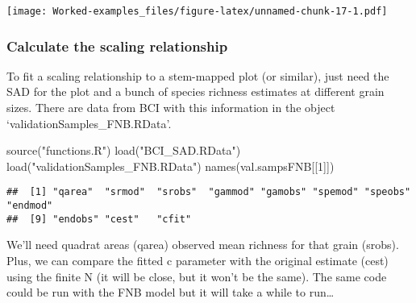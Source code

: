 \documentclass[
]{article}
\newenvironment{Shaded}{\begin{snugshade}}{\end{snugshade}}
\newcommand{\AttributeTok}[1]{\textcolor[rgb]{0.77,0.63,0.00}{#1}}
\newcommand{\CommentTok}[1]{\textcolor[rgb]{0.56,0.35,0.01}{\textit{#1}}}
\newcommand{\ControlFlowTok}[1]{\textcolor[rgb]{0.13,0.29,0.53}{\textbf{#1}}}
\newcommand{\DecValTok}[1]{\textcolor[rgb]{0.00,0.00,0.81}{#1}}
\newcommand{\FloatTok}[1]{\textcolor[rgb]{0.00,0.00,0.81}{#1}}
\newcommand{\FunctionTok}[1]{\textcolor[rgb]{0.00,0.00,0.00}{#1}}
\newcommand{\NormalTok}[1]{#1}
\newcommand{\OtherTok}[1]{\textcolor[rgb]{0.56,0.35,0.01}{#1}}
\newcommand{\SpecialCharTok}[1]{\textcolor[rgb]{0.00,0.00,0.00}{#1}}
\newcommand{\StringTok}[1]{\textcolor[rgb]{0.31,0.60,0.02}{#1}}
\begin{document}
\texttt{[image: Worked-examples\_files/figure-latex/unnamed-chunk-17-1.pdf]}

\hypertarget{calculate-the-scaling-relationship}{%
\subsubsection{Calculate the scaling
relationship}\label{calculate-the-scaling-relationship}}

To fit a scaling relationship to a stem-mapped plot (or similar), just
need the SAD for the plot and a bunch of species richness estimates at
different grain sizes. There are data from BCI with this information in
the object `validationSamples\_FNB.RData'.

\begin{Shaded}
\begin{Highlighting}[]
\FunctionTok{source}\NormalTok{(}\StringTok{"functions.R"}\NormalTok{)}
\FunctionTok{load}\NormalTok{(}\StringTok{"BCI\_SAD.RData"}\NormalTok{)}
\FunctionTok{load}\NormalTok{(}\StringTok{"validationSamples\_FNB.RData"}\NormalTok{)}
\FunctionTok{names}\NormalTok{(val.sampsFNB[[}\DecValTok{1}\NormalTok{]])}
\end{Highlighting}
\end{Shaded}

\begin{verbatim}
##  [1] "qarea"  "srmod"  "srobs"  "gammod" "gamobs" "spemod" "speobs" "endmod"
##  [9] "endobs" "cest"   "cfit"
\end{verbatim}

We'll need quadrat areas (qarea) observed mean richness for that grain
(srobs). Plus, we can compare the fitted c parameter with the original
estimate (cest) using the finite N (it will be close, but it won't be
the same). The same code could be run with the FNB model but it will
take a while to run\ldots{}

\begin{Shaded}
\end{Shaded}
\end{document}
